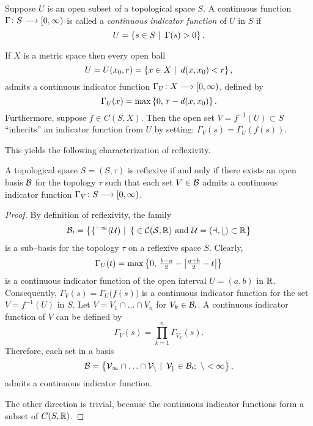 \begin{defn}
Suppose $U$ is an open subset of a topological space $S$. A
continuous function $\Gamma\colon S \longrightarrow [0,\infty)$ is called a
{\em continuous indicator function} of $U$ in $S$ if
\[ U = \left\{s\in S \,\,|\,\,\, \Gamma(s) > 0\right\}.  \]
\end{defn}

\begin{rem}
If $X$ is a metric space then every open ball
\[ U=U(x_0,r)=\left\{x\in X \,\,|\,\,\, d(x,x_0) < r\right\}, \]
admits a continuous indicator function
$\Gamma_U\colon{X}\longrightarrow[0,\infty)$, defined by
\[ \Gamma_U(x) = \max\left\{0, \, r - d(x,x_0) \right\}. \]
Furthermore, suppose $f \in C(S,X)$. Then the open set
$V=f^{-1}(U)\subset S$ ``inherits'' an indicator function from
$U$ by setting: $\Gamma_V(s)=\Gamma_U(f(s))$.
\end{rem}

\smallskip
\goodbreak

This yields the following characterization of reflexivity.

\begin{prop} \label{p:REFLEX}
A topological space $S=(S,\tau)$ is reflexive if and only if
there exists an open basis $\cal B$ for the topology $\tau$
such that each set $V\in\cal B$ admits a continuous indicator
function $\Gamma_V\colon{}S\longrightarrow[0,\infty)$.
\end{prop}

\begin{proof}
By definition of reflexivity, the family
\[ \cal B_0 = \left\{f^{-1}(U) \,\,|\,\,\, f \in C(S,\mathbb R) \text { and }
   U=(a,b) \subset \mathbb R \right\} \]
is a sub--basis for the topology $\tau$ on a reflexive space
$S$. Clearly,
\[ \Gamma_U(t) = \max\left\{0, \, \tfrac{b-a}{2}-\left\vert\tfrac{a+b}{2}-t\right\vert\right\} \]
is a continuous indicator function of the open interval
$U=(a,b)$ in $\mathbb R$. Consequently, $\Gamma_V(s) =
\Gamma_U\big(f(s)\big)$ is a continuous indicator function for
the set $V=f^{-1}(U)$ in $S$. Let $V=V_1 \cap\ldots\cap V_n$
for $V_k\in\cal{B}_0$. A continuous indicator function of $V$
can be defined by
\[ \Gamma_V(s) = \prod_{k=1}^n \Gamma_{V_k}(s). \]
Therefore, each set in a basis
\[ \cal B = \left\{V_1 \cap\ldots\cap V_n \,\,|\,\,\, V_k\in\cal{B}_0;
   \,\, n < \infty\right\}, \]
admits a continuous indicator function.

\smallskip

The other direction is trivial, because the continuous
indicator functions form a subset of $C(S,\mathbb R)$.
\end{proof}

